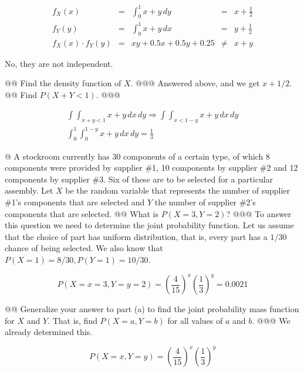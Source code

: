 \documentclass[11pt]{article}\usepackage[]{graphicx}\usepackage[]{xcolor}
\begin{document}
\begin{easylist}[enumerate]
    \[
        \begin{aligned}
            f_X(x) &=& \int_0^1 x + y \, dy &=& x + \frac{1}{2}\\
            f_Y(y) &=& \int_0^1 x + y \, dx &=& y + \frac{1}{2}\\
            f_X(x) \cdot f_Y(y) &=& x y+0.5 x+0.5 y+0.25 &\neq& x + y
        \end{aligned}
    \]

    No, they are not independent.

    @@ Find the density function of $X$.
    @@@ Answered above, and we get $x + 1/2$.
    @@ Find $P(X + Y < 1)$.
    @@@

    \[
        \begin{aligned}
            \int\int_{x + y < 1} x + y \, dx \, dy \Rightarrow \int\int_{x < 1 - y} x + y \, dx \, dy\\
            \int_0^1 \int_0^{1 - y} x + y \, dx \, dy = \boxed{\frac{1}{3} }
        \end{aligned}
    \]

    @ A stockroom currently has 30 components of a certain type, of which 8 components were provided by supplier \#1, 10
    components by supplier \#2 and 12 components by supplier \#3. Six of these are to be selected for a particular
    assembly. Let $X$ be the random variable that represents the number of supplier \#1's components that are selected
    and $Y$ the number of supplier \#2's components that are selected.
    @@ What is $P(X = 3, Y = 2)$?
    @@@ To answer this question we need to determine the joint probability function. Let us assume that the choice of
    part has uniform distribution, that is, every part has a $1/30$ chance of being selected. We also know that
    $P(X=1)=8/30, P(Y=1)=10/30$.




    \[
        P(X=x=3, Y=y=2) = {\left( \frac{4}{15} \right)}^x { \left( \frac{1}{3} \right)}^y = 0.0021
    \]

    @@ Generalize your answer to part (a) to find the joint probability mass function for $X$ and $Y$.  That is, find
    $P(X = a, Y = b)$ for all values of $a$ and $b$.
    @@@ We already determined this.

    \[
        P(X=x, Y=y) = {\left( \frac{4}{15} \right)}^x { \left( \frac{1}{3} \right)}^y
    \]


\end{easylist}
\end{document}
